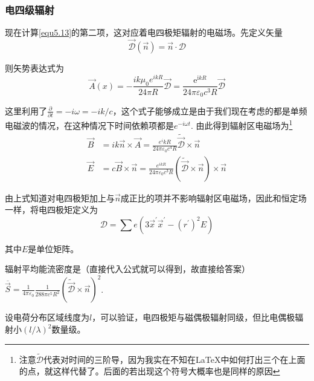 \documentclass[UTF8]{ctexart}
\begin{document}
    \subsubsection{电四级辐射}
    现在计算\autoref{equ5.13}的第二项，这对应着电四极矩辐射的电磁场。先定义矢量
    \begin{equation}
        \vec{\mathscr{D}}(\vec{n}) = \vec{n} \cdot \mathbf{\mathscr{D}}
    \end{equation}

\noindent 则矢势表达式为
\begin{equation}
    \vec{A}(x)=-\frac{i k \mu_{0} e^{i k R}}{24 \pi R} \vec{\mathscr{D}}=\frac{\mathrm{e}^{\mathrm{i} k R}}{24 \pi \varepsilon_{0} c^{3} R} \vec{\mathscr{D}}
\end{equation}

\noindent 这里利用了$\frac{\partial}{\partial t} = - i \omega  = - i k /c$，这个式子能够成立是由于我们现在考虑的都是单频电磁波的情况，在这种情况下时间依赖项都是$e^{-i \omega t}$. 由此得到辐射区电磁场为\footnote{注意$\tilde{\mathscr{D}}$代表对时间的三阶导，因为我实在不知在LaTeX中如何打出三个在上面的点，就这样代替了。后面的若出现这个符号大概率也是同样的原因}
\begin{equation}
    \begin{aligned}
        \vec{B} &= ik \vec{n} \times \vec{A} = \frac{e^ikR}{24 \pi \varepsilon_0 c^4 R}
        \tilde{\vec{\mathscr{D}}} \times \vec{n} \\
        \vec{E} &=c \vec{B} \times \vec{n} = \frac{e^{ikR}}{24 \pi \varepsilon_0 c^3 R} (\tilde{\vec{\mathscr{D}}} \times \vec{n}) \times \vec{n}
    \end{aligned}
\end{equation}

\noindent 由上式知道对电四极矩加上与$\vec{n}$成正比的项并不影响辐射区电磁场，因此和恒定场一样，将电四极矩定义为
\begin{equation}
    \mathbf{\mathscr{D}} = \sum e(3\vec{x}^{\prime} \vec{x}^{\prime}- (r^{\prime})^2 E)
\end{equation}

\noindent 其中$E$是单位矩阵。

    辐射平均能流密度是（直接代入公式就可以得到，故直接给答案）$\overline{\vec{S}} = \frac{1}{4 \pi \varepsilon_0} \frac{1}{288 \pi c^5 R^2} (\tilde{\vec{\mathscr{D}}} \times \vec{n})^2$.

\noindent 设电荷分布区域线度为$l$，可以验证，电四极矩与磁偶极辐射同级，但比电偶极辐射小$(l/\lambda)^2$数量级。
\end{document}
